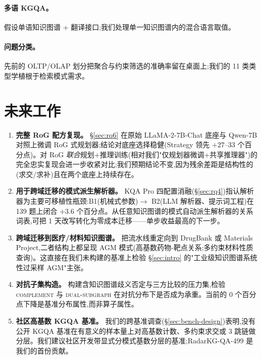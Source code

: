 \documentclass[11pt,a4paper]{article}
\newcommand{\op}[1]{\textsc{\small #1}}
\begin{document}
\paragraph{多语 KGQA。} \citet{perevalov2024multilingual} 假设单语知识图谱 + 翻译接口;我们处理单一知识图谱内的混合语言取值。

\paragraph{问题分类。} 先前的 OLTP/OLAP 划分把聚合与约束筛选的准确率留在桌面上;我们的 11 类类型学植根于检索模式需求。

\section{未来工作}
\label{sec:future}

\begin{enumerate}[topsep=0pt,itemsep=2pt,leftmargin=*]
  \item \textbf{完整 RoG 配方复现。} \S\ref{sec:rq6} 在原始 LLaMA-2-7B-Chat 底座与 Qwen-7B 对照上微调 RoG 式规划器;结论对底座选择稳健(Strategy 领先 $+27$--$33$ 个百分点)。对 RoG \emph{联合}规划+推理训练(相对我们"仅规划器微调+共享推理器")的完全忠实复现会进一步收紧对比;我们预期结论不变,因为残余差距是结构性的(求交/求补)且在两个底座上持续存在。
  \item \textbf{用于跨域迁移的模式派生解析器。} KQA Pro 四配置消融(\S\ref{sec:rq4})指认解析器为主要可移植性瓶颈:B1(机械式参数)$\to$ B2(LLM 解析器、提示词工程)在 139 题上闭合 $+3.6$ 个百分点。从任意知识图谱的模式自动派生解析器的关系词表,可把 1 天改写转化为零成本迁移——单步收益最高的下一步。
  \item \textbf{跨域迁移到医疗/材料知识图谱。} 把流水线重定向到 DrugBank 或 Materials Project,二者结构上都呈现 AGM 模式(高基数药物-靶点关系;多约束材料性质查询)。这直接在我们未构建的基准上检验 \S\ref{sec:intro} 的"工业级知识图谱系统性过采样 AGM"主张。
  \item \textbf{对抗子集构造。} 构建含知识图谱歧义否定与三方比较的压力集,检验 \op{complement} 与 \op{dual-subgraph} 在对抗分布下是否成为承重。当前的 0 个百分点下降是基准分布属性,而非算子属性。
  \item \textbf{社区高基数 KGQA 基准。} 我们的跨基准调查(\S\ref{sec:bench-design})表明,没有公开 KGQA 基准在有意义的样本量上对高基数计数、多约束求交或 3 跳链做分层。我们建议社区开发带显式分模式基数分层的基准;RadarKG-QA-499 是我们的首份贡献。
\end{enumerate}
\end{document}
